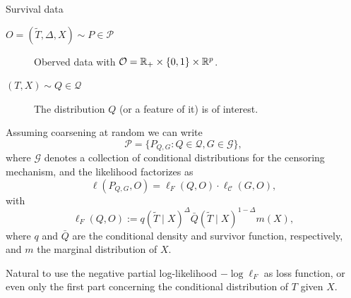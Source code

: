 \documentclass[smaller]{beamer}\usepackage{listings}
\begin{document}
\begin{frame}[label={sec:orgdc10243}]{Survival data}
\small

\begin{description}
\item[{\(O = (\tilde T, \Delta, X) \sim P \in \mathcal{P}\)}] Oberved data with \(\mathcal{O} = \mathbb{R}_+
  \times \{0,1\} \times \mathbb{R}^p\).
\item[{\((T, X) \sim Q \in \mathcal{Q}\)}] The distribution \(Q\) (or a feature of it) is of interest.
\end{description}

\vfill

Assuming coarsening at random \citep{gill1997coarsening} we can write
\begin{equation*}
  \mathcal{P} = \{P_{Q, G} : Q \in \mathcal{Q}, G \in \mathcal{G}\},
\end{equation*}
where $\mathcal{G}$ denotes a collection of conditional distributions for the censoring mechanism,
and the likelihood factorizes as
\begin{equation*}
  \ell(P_{Q, G}, O) = \ell_F(Q, O) \cdot \ell_{\mathcal{C}}(G, O),
\end{equation*}
with
\begin{equation*}
  \ell_F(Q, O) := q(\tilde T \mid X)^{\Delta}\bar{Q}(\tilde T \mid X)^{1-\Delta} m(X),
\end{equation*}
where $q$ and $\bar{Q}$ are the conditional density and survivor function, respectively, and $m$ the
marginal distribution of $X$.

\vfill

Natural to use the negative partial log-likelihood \(-\log\ell_F\) as loss function, or even only the
first part concerning the conditional distribution of \(T\) given \(X\).
\end{frame}
\end{document}
